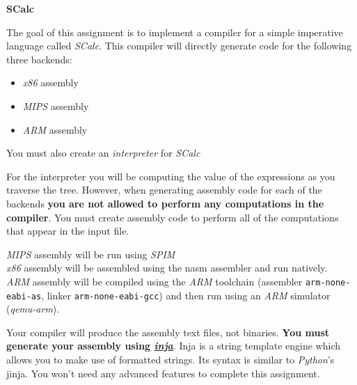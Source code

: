 \documentclass{article}
\newcommand{\code}[1]{\texttt{\textmd{#1}}}
\begin{document}
\ifpdf
  \LARGE
  \textbf{SCalc}
  \normalsize
\fi

The goal of this assignment is to implement a compiler for a simple imperative language called
\textit{SCalc}. This compiler will directly generate code for the following three backends:
\begin {itemize}
  \item \textit{x86} assembly
  \item \textit{MIPS} assembly
  \item \textit{ARM} assembly
\end {itemize}
You must also create an \textit{interpreter} for \textit{SCalc}

For the interpreter you will be computing the value of the expressions as you traverse the tree.
However, when generating assembly code for each of the backends \textbf{you are not allowed to
perform any computations in the compiler}. You must create assembly code to perform all of the
computations that appear in the input file.

\textit{MIPS} assembly will be run using \textit{SPIM}\\
\textit{x86} assembly will be assembled using the nasm assembler and run natively.\\
\textit{ARM} assembly will be compiled using the \textit{ARM} toolchain (assembler
\code{arm-none-eabi-as}, linker \code{arm-none-eabi-gcc}) and then run using an \textit{ARM}
simulator (\textit{qemu-arm}).

Your compiler will produce the assembly text files, not binaries. \textbf{You must generate your
assembly using \href{https://github.com/pantor/inja}{\textit{inja}}}. Inja is a string template
engine which allows you to make use of formatted strings. Its syntax is similar to
\textit{Python}'s jinja. You won't need any advanced features to complete this assignment.
\end{document}
